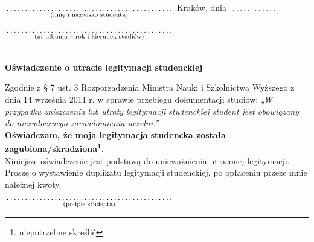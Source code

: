 \documentclass[a4paper,11pt]{article}
\newcommand{\fillField}[2]{
    $\underset{\text{#1}}{\parbox[t]{#2}{\dotfill}}$
}
\begin{document}
\noindent
\fillField{(imię i nazwisko studenta)}{7cm} \hfill Kraków, dnia \fillField{}{2cm} \\\\
\fillField{(nr albumu – rok i kierunek studiów)}{7cm} \\\\

\vskip 1.0cm
\begin{center}
{\Large \textbf{Oświadczenie o utracie legitymacji studenckiej}}
\end{center}
\vskip 0.5cm

Zgodnie z § 7 ust. 3 Rozporządzenia Ministra Nauki i Szkolnictwa Wyższego z dnia 14 września 2011 r. w sprawie przebiegu dokumentacji studiów: \textit{„W przypadku zniszczenia lub utraty legitymacji studenckiej student jest obowiązany do niezwłocznego zawiadomienia uczelni.”} \\

\noindent
\textbf{Oświadczam, że moja legitymacja studencka została zagubiona/skradziona\footnote[1]{niepotrzebne skreślić}.} \\

\noindent
Niniejsze oświadczenie jest podstawą do unieważnienia utraconej legitymacji. \\

\noindent
Proszę o wystawienie duplikatu legitymacji studenckiej, po opłaceniu przeze mnie należnej kwoty.

\vskip 1.2cm
\hspace{\fill} \fillField{(podpis studenta)}{7cm} \hspace{2.0cm}
\end{document}
